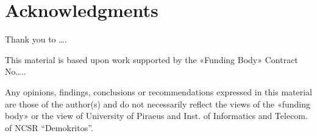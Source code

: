 
    
    

\section*{Acknowledgments}

\begin{flushleft}
    Thank you to ….
    
    This material is based upon work supported by the «Funding Body» Contract No…..
    
    Any opinions, findings, conclusions or recommendations expressed in this material are those of the author(s) and do not necessarily reflect the views of the «funding body» or the view of University of Piraeus and Inst. of Informatics and Telecom. of NCSR “Demokritos”. 
\end{flushleft}